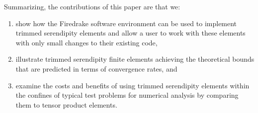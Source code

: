 \documentclass[format=acmsmall,screen,timestamp=false,a4paper]{acmart}
\newcommand{\calS}{\mathcal{S}}
\begin{document}
  
  
  
  
Summarizing, the contributions of this paper are that we:
\begin{enumerate}
\item show how the Firedrake software environment can be used to implement trimmed serendipity elements and allow a user to work with these elements with only small changes to their existing code, 
\item illustrate trimmed serendipity finite elements achieving the theoretical bounds that are predicted in terms of convergence rates, and  
\item examine the costs and benefits of using trimmed serendipity elements within the confines of typical test problems for numerical analysis by comparing them to tensor product elements.
\end{enumerate}
  
\end{document}
